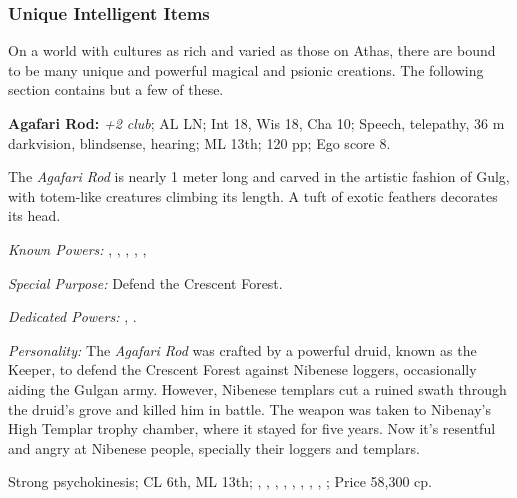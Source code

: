 \subsubsection{Unique Intelligent Items}
On a world with cultures as rich and varied as those on Athas, there are bound to be many unique and powerful magical and psionic creations. The following section contains but a few of these.


\textbf{Agafari Rod:}
\emph{+2 club};
AL LN;
Int 18, Wis 18, Cha 10;
Speech, telepathy, 36 m darkvision, blindsense, hearing;
ML 13th;
120 pp;
Ego score 8.

The \emph{Agafari Rod} is nearly 1 meter long and carved in the artistic fashion of Gulg, with totem-like creatures climbing its length. A tuft of exotic feathers decorates its head.

\textit{Known Powers:}
	, %
	, %
	, %
	, %
	, %

\textit{Special Purpose:} Defend the Crescent Forest.

\textit{Dedicated Powers:}
	, %
	. %

\textit{Personality:} The \emph{Agafari Rod} was crafted by a powerful druid, known as the Keeper, to defend the Crescent Forest against Nibenese loggers, occasionally aiding the Gulgan army. However, Nibenese templars cut a ruined swath through the druid's grove and killed him in battle. The weapon was taken to Nibenay's High Templar trophy chamber, where it stayed for five years. Now it's resentful and angry at Nibenese people, specially their loggers and templars.

Strong psychokinesis;
CL 6th,
ML 13th;
,
,
,
,
,
,
,
,
;
Price 58,300 cp.


